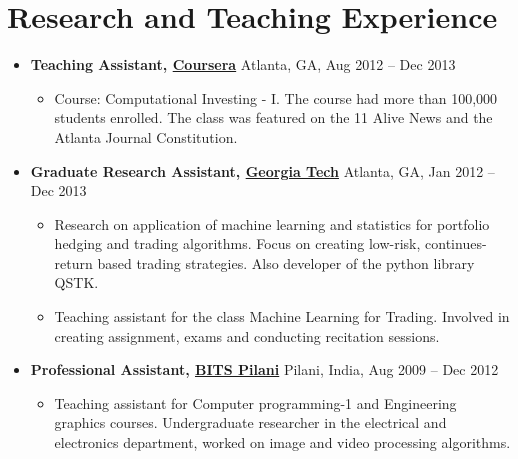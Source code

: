 \documentclass[letterpaper,11pt]{article}
\newcommand{\resitem}[1]{\item #1 \vspace{-2pt}}
\newcommand{\ressubheading}[4]{\textbf{#3, #1} \hfill \small{#2, #4} \vspace{-8pt}}
\begin{document}
\vspace{1pt}
\section{Research and Teaching Experience}
    \begin{itemize}
        \item 
            \ressubheading{\href{https://www.coursera.org/course/compinvesting1}{Coursera}}{Atlanta, GA}{Teaching Assistant}{Aug 2012 -- Dec 2013}
                { \small
                \begin{itemize}
                    \resitem{Course: Computational Investing - I. The course had more than 100,000 students enrolled. The class was featured on the 11 Alive News and the Atlanta Journal Constitution.}
                \end{itemize}
                }
        \item           
            \ressubheading{\href{https://www.gatech.edu}{Georgia Tech}}{Atlanta, GA}{Graduate Research Assistant}{Jan 2012 -- Dec 2013}
                { \small                
                \begin{itemize}
         \resitem{Research on application of machine learning and statistics for portfolio hedging and trading algorithms. Focus on creating low-risk, continues-return based trading strategies. Also developer of the python library QSTK.}
                    \resitem{Teaching assistant for the class Machine Learning for Trading. Involved in creating assignment, exams and conducting recitation sessions.}
                \end{itemize}
                }
        \item 
            \ressubheading{\href{http://www.bits-pilani.ac.in}{BITS Pilani}}{Pilani, India}{Professional Assistant}{Aug 2009 -- Dec 2012}
                { \small
                \begin{itemize}
                    \resitem{Teaching assistant for Computer programming-1 and Engineering graphics courses. Undergraduate researcher in the electrical and electronics department, worked on image and video processing algorithms.
                \end{itemize}
                }
    }\end{itemize}  %

\vspace{-8pt}
\end{document}
